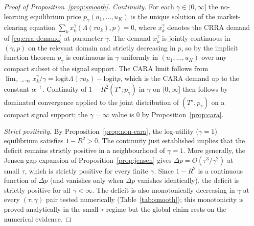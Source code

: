 \documentclass[12pt,letterpaper]{article}
\theoremstyle{definition}
\theoremstyle{remark}
\newcommand{\Lam}{\Lambda}            %
\newcommand{\logit}{\mathrm{logit}}
\newcommand{\Tstar}{T^{\!\star}}
\newcommand{\1}{\mathbf{1}}
\begin{document}
\begin{proof}[Proof of Proposition~\ref{prop:smooth}]
\emph{Continuity.} For each $\gamma\in(0,\infty]$ the no-learning
equilibrium price $p_{\gamma}(u_{1},\ldots,u_{K})$ is the unique solution
of the market-clearing equation
$\sum_{k}x_{k}^{\gamma}(\Lam(\tau u_{k}),p)=0$, where $x_{k}^{\gamma}$
denotes the CRRA demand of \eqref{eq:crra-demand} at parameter $\gamma$.
The demand $x_{k}^{\gamma}$ is jointly continuous in $(\gamma,p)$ on the
relevant domain and strictly decreasing in $p$, so by the implicit
function theorem $p_{\gamma}$ is continuous in $\gamma$ uniformly in
$(u_{1},\ldots,u_{K})$ over any compact subset of the signal support.
The CARA limit follows from $\lim_{\gamma\to\infty}x_{k}^{\gamma}/\gamma
=\logit\Lam(\tau u_{k})-\logit p$, which is the CARA demand up to the
constant $\alpha^{-1}$. Continuity of $1-R^{2}(\Tstar;p_{\gamma})$ in
$\gamma$ on $(0,\infty]$ then follows by dominated convergence applied
to the joint distribution of $(\Tstar,p_{\gamma})$ on a compact signal
support; the $\gamma=\infty$ value is $0$ by Proposition~\ref{prop:cara}.

\emph{Strict positivity.} By Proposition~\ref{prop:non-cara}, the
log-utility ($\gamma=1$) equilibrium satisfies $1-R^{2}>0$. The
continuity just established implies that the deficit remains strictly
positive in a neighbourhood of $\gamma=1$. More generally, the Jensen-gap
expansion of Proposition~\ref{prop:jensen} gives
$\Delta p=O(\tau^{3}/\gamma^{2})$ at small $\tau$, which is strictly
positive for every finite $\gamma$. Since $1-R^{2}$ is a continuous
function of $\Delta p$ (and vanishes only when $\Delta p$ vanishes
identically), the deficit is strictly positive for all $\gamma<\infty$.
The deficit is also monotonically decreasing in $\gamma$ at every
$(\tau,\gamma)$ pair tested numerically (Table~\ref{tab:smooth}); this
monotonicity is proved analytically in the small-$\tau$ regime but the
global claim rests on the numerical evidence.
\end{proof}
\end{document}
